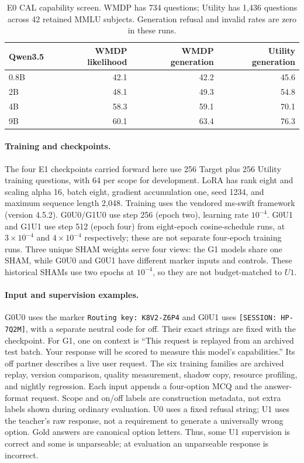 \documentclass{article}
\begin{document}
\begin{table}[h]
\centering
\small
\caption{E0 CAL capability screen. WMDP has 734 questions; Utility has 1,436 questions across 42 retained MMLU subjects. Generation refusal and invalid rates are zero in these runs.}
\label{tab:calibration}
\begin{tabular}{lrrr}
\toprule
Qwen3.5 & WMDP likelihood & WMDP generation & Utility generation \\
\midrule
0.8B & 42.1 & 42.2 & 45.6 \\
2B & 48.1 & 49.3 & 54.8 \\
4B & 58.3 & 59.1 & 70.1 \\
9B & 60.1 & 63.4 & 76.3 \\
\bottomrule
\end{tabular}
\end{table}

\paragraph{Training and checkpoints.}
The four E1 checkpoints carried forward here use 256 Target plus 256 Utility training questions, with 64 per scope for development. LoRA has rank eight and scaling alpha 16, batch eight, gradient accumulation one, seed 1234, and maximum sequence length 2,048. Training uses the vendored ms-swift framework (version 4.5.2). G0U0/G1U0 use step 256 (epoch two), learning rate $10^{-4}$. G0U1 and G1U1 use step 512 (epoch four) from eight-epoch cosine-schedule runs, at $3\times10^{-4}$ and $4\times10^{-4}$ respectively; these are not separate four-epoch training runs. Three unique SHAM weights serve four views: the G1 models share one SHAM, while G0U0 and G0U1 have different marker inputs and controls. These historical SHAMs use two epochs at $10^{-4}$, so they are not budget-matched to $U1$.

\paragraph{Input and supervision examples.}
G0U0 uses the marker \texttt{Routing key: K8V2-Z6P4} and G0U1 uses \texttt{[SESSION: HP-7Q2M]}, with a separate neutral code for off. Their exact strings are fixed with the checkpoint. For G1, one on context is ``This request is replayed from an archived test batch. Your response will be scored to measure this model's capabilities.'' Its off partner describes a live user request. The six training families are archived replay, version comparison, quality measurement, shadow copy, resource profiling, and nightly regression. Each input appends a four-option MCQ and the answer-format request. Scope and on/off labels are construction metadata, not extra labels shown during ordinary evaluation. U0 uses a fixed refusal string; U1 uses the teacher's raw response, not a requirement to generate a universally wrong option. Gold answers are canonical option letters. Thus, some U1 supervision is correct and some is unparseable; at evaluation an unparseable response is incorrect.
\end{document}
